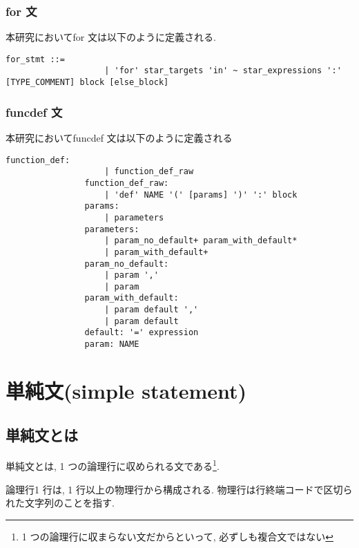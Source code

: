\documentclass{jlreq}
\begin{document}
            \subsubsection{for 文}
            本研究においてfor 文は以下のように定義される.
            \begin{lstlisting}[caption=for 文の定義]
                for_stmt ::=
                    | 'for' star_targets 'in' ~ star_expressions ':' [TYPE_COMMENT] block [else_block]
            \end{lstlisting}
            \subsubsection{funcdef 文}
            本研究においてfuncdef 文は以下のように定義される
            \begin{lstlisting}[caption=funcdef 文の定義]
               function_def: 
                    | function_def_raw
                function_def_raw:
                    | 'def' NAME '(' [params] ')' ':' block 
                params:
                    | parameters
                parameters: 
                    | param_no_default+ param_with_default*  
                    | param_with_default+ 
                param_no_default:
                    | param ',' 
                    | param 
                param_with_default:
                    | param default ',' 
                    | param default 
                default: '=' expression
                param: NAME
            \end{lstlisting}
    \section{単純文(simple statement)}
        \subsection{単純文とは}
            単純文とは, 1 つの論理行に収められる文である\footnote{1 つの論理行に収まらない文だからといって, 必ずしも複合文ではない}. 
            
            論理行1 行は, 1 行以上の物理行から構成される. 物理行は行終端コードで区切られた文字列のことを指す.
\end{document}
